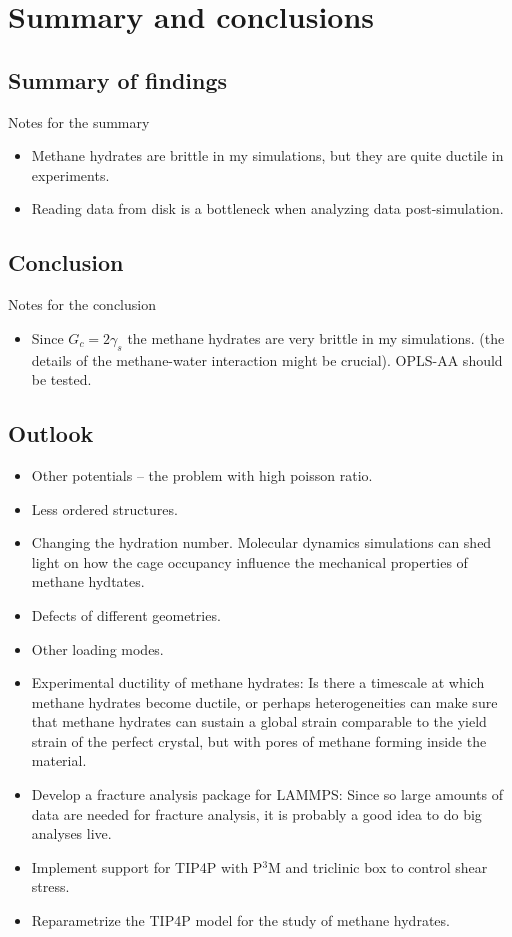 \chapter{Summary and conclusions}

\section{Summary of findings}
Notes for the summary
\begin{itemize}
\item Methane hydrates are brittle in my simulations, but they are quite ductile in experiments.
\item Reading data from disk is a bottleneck when analyzing data post-simulation. 
\end{itemize}

\section{Conclusion}
Notes for the conclusion
\begin{itemize}
\item Since $G_c = 2\gamma_s$ the methane hydrates are very brittle in my simulations. (the details of the methane-water interaction might be crucial). OPLS-AA should be tested.
\end{itemize}


\section{Outlook}
\begin{itemize}
\item Other potentials – the problem with high poisson ratio.
\item Less ordered structures.
\item Changing the hydration number. Molecular dynamics simulations can shed light on how the cage occupancy influence the mechanical properties of methane hydtates.
\item Defects of different geometries.
\item Other loading modes.
\item Experimental ductility of methane hydrates: Is there a timescale at which methane hydrates become ductile, or perhaps heterogeneities can make sure that methane hydrates can sustain a global strain comparable to the yield strain of the perfect crystal, but with pores of methane forming inside the material. 
\item Develop a fracture analysis package for LAMMPS: Since so large amounts of data are needed for fracture analysis, it is probably a good idea to do big analyses live.
\item Implement support for TIP4P with P$^3$M and triclinic box to control shear stress.
\item Reparametrize the TIP4P model for the study of methane hydrates.
\end{itemize}
